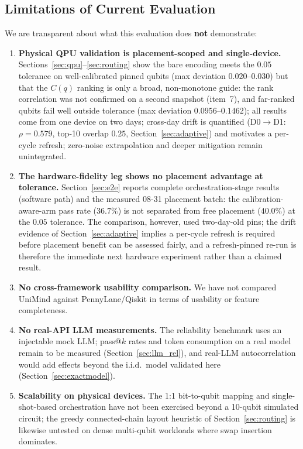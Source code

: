 ﻿\documentclass[12pt,a4paper]{article}
\begin{document}
\subsection{Limitations of Current Evaluation}\label{sec:limits}

We are transparent about what this evaluation does \textbf{not} demonstrate:

\begin{enumerate}[leftmargin=2em]
    \item \textbf{Physical QPU validation is placement-scoped and single-device.} Sections~\ref{sec:qpu}--\ref{sec:routing} show the bare encoding meets the $0.05$ tolerance on well-calibrated pinned qubits (max deviation $0.020$--$0.030$) but that the $C(q)$ ranking is only a broad, non-monotone guide: the rank correlation was not confirmed on a second snapshot (item~7), and far-ranked qubits fail well outside tolerance (max deviation $0.0956$--$0.1462$); all results come from one device on two days; cross-day drift is quantified (D0$\to$D1: $\rho{=}0.579$, top-10 overlap $0.25$, Section~\ref{sec:adaptive}) and motivates a per-cycle refresh; zero-noise extrapolation and deeper mitigation remain unintegrated.
    \item \textbf{The hardware-fidelity leg shows no placement advantage at tolerance.} Section~\ref{sec:e2e} reports complete orchestration-stage results (software path) and the measured 08-31 placement batch: the calibration-aware-arm pass rate ($36.7\%$) is not separated from free placement ($40.0\%$) at the $0.05$ tolerance. The comparison, however, used two-day-old pins; the drift evidence of Section~\ref{sec:adaptive} implies a per-cycle refresh is required before placement benefit can be assessed fairly, and a refresh-pinned re-run is therefore the immediate next hardware experiment rather than a claimed result.
    \item \textbf{No cross-framework usability comparison.} We have not compared UniMind against PennyLane/Qiskit in terms of usability or feature completeness.
    \item \textbf{No real-API LLM measurements.} The reliability benchmark uses an injectable mock LLM; pass@$k$ rates and token consumption on a real model remain to be measured (Section~\ref{sec:llm_rel}), and real-LLM autocorrelation would add effects beyond the i.i.d.\ model validated here (Section~\ref{sec:exactmodel}).
    \item \textbf{Scalability on physical devices.} The 1:1 bit-to-qubit mapping and single-shot-based orchestration have not been exercised beyond a 10-qubit simulated circuit; the greedy connected-chain layout heuristic of Section~\ref{sec:routing} is likewise untested on dense multi-qubit workloads where swap insertion dominates.

\end{enumerate}
\end{document}
